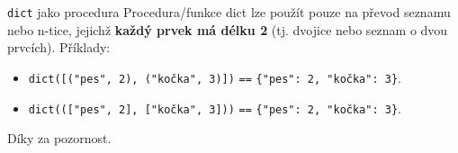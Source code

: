 \documentclass[aspectratio=169,11pt]{beamer}
\begin{document}
\begin{frame}{\texttt{dict} jako procedura}
 Procedura/funkce \alert{dict} lze použít pouze na převod seznamu nebo n-tice,
 jejichž \textbf{každý prvek má délku 2} (tj. dvojice nebo seznam o dvou
 prvcích). Příklady:
 \begin{itemize}
  \item \texttt{dict([("pes", 2), ("kočka", 3)])} \texttt{==} \texttt{\{"pes":
   2, "kočka": 3\}}.
  \item \texttt{dict((["pes", 2], ["kočka", 3]))} \texttt{==} \texttt{\{"pes":
   2, "kočka": 3\}}.
 \end{itemize}
\end{frame}

\begin{frame}[plain]
 \centering\Huge Díky za pozornost.
\end{frame}
\end{document}
